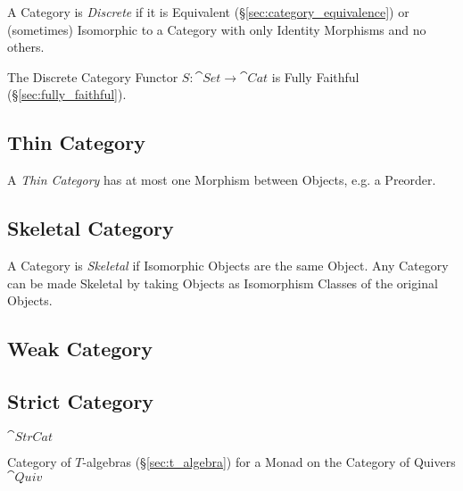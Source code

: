 A Category is \emph{Discrete} if it is Equivalent
(\S\ref{sec:category_equivalence}) or (sometimes) Isomorphic to a
Category with only Identity Morphisms and no others.

The Discrete Category Functor $S : \cat{Set} \rightarrow
\cat{Cat}$ is Fully Faithful (\S\ref{sec:fully_faithful}).



\subsection{Thin Category}\label{sec:thin_category}

A \emph{Thin Category} has at most one Morphism between Objects, e.g.
a Preorder.



\subsection{Skeletal Category}\label{sec:skeletal_category}

A Category is \emph{Skeletal} if Isomorphic Objects are the same
Object. Any Category can be made Skeletal by taking Objects as
Isomorphism Classes of the original Objects.



\subsection{Weak Category}\label{sec:weak_category}

\subsection{Strict Category}\label{sec:strict_category}

$\cat{StrCat}$

Category of $T$-algebras (\S\ref{sec:t_algebra}) for a Monad on the
Category of Quivers $\cat{Quiv}$



